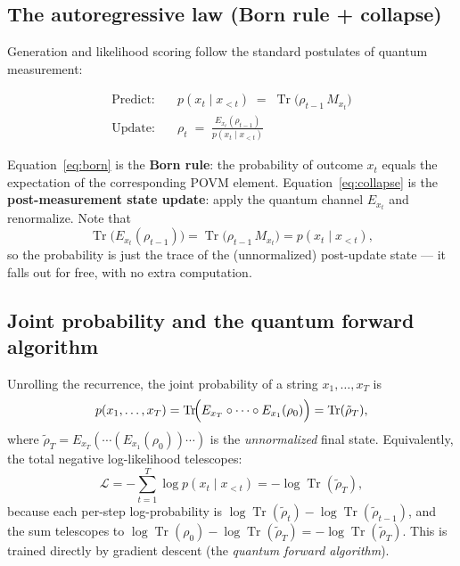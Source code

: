 \documentclass[11pt,a4paper]{article}
\newcommand{\Tr}{\operatorname{Tr}}
\newcommand{\Ex}[1]{E_{#1}}         %
\newcommand{\Mx}[1]{M_{#1}}         %
\newcommand{\NLL}{\mathcal{L}}
\theoremstyle{plain}
\begin{document}
\subsection{The autoregressive law (Born rule + collapse)}

Generation and likelihood scoring follow the standard postulates of
quantum measurement:

\begin{align}
  \text{Predict:} \quad &
    p(x_t \mid x_{<t}) \;=\; \Tr\!\bigl(\rho_{t-1}\,\Mx{x_t}\bigr)
    \label{eq:born}
  \\[6pt]
  \text{Update:} \quad &
    \rho_t \;=\; \frac{\Ex{x_t}(\rho_{t-1})}{p(x_t \mid x_{<t})}
    \label{eq:collapse}
\end{align}

Equation~\eqref{eq:born} is the \textbf{Born rule}: the probability of
outcome $x_t$ equals the expectation of the corresponding POVM element.
Equation~\eqref{eq:collapse} is the \textbf{post-measurement state
update}: apply the quantum channel $\Ex{x_t}$ and renormalize. Note
that
\[
  \Tr\bigl(\Ex{x_t}(\rho_{t-1})\bigr)
  = \Tr\!\bigl(\rho_{t-1}\,\Mx{x_t}\bigr)
  = p(x_t \mid x_{<t}),
\]
so the probability is just the trace of the (unnormalized) post-update
state --- it falls out for free, with no extra computation.

\subsection{Joint probability and the quantum forward algorithm}

Unrolling the recurrence, the joint probability of a string
$x_1,\ldots,x_T$ is
\begin{equation}\label{eq:joint}
  p(x_1,\ldots,x_T)
  = \Tr\!\Bigl(\Ex{x_T} \circ \cdots \circ \Ex{x_1}(\rho_0)\Bigr)
  = \Tr(\tilde\rho_T),
\end{equation}
where $\tilde\rho_T = \Ex{x_T}(\cdots(\Ex{x_1}(\rho_0))\cdots)$ is
the \emph{unnormalized} final state. Equivalently, the total
negative log-likelihood telescopes:
\begin{equation}\label{eq:nll_telescope}
  \NLL
  = -\sum_{t=1}^T \log p(x_t \mid x_{<t})
  = -\log \Tr(\tilde\rho_T),
\end{equation}
because each per-step log-probability is $\log\Tr(\tilde\rho_t) -
\log\Tr(\tilde\rho_{t-1})$, and the sum telescopes to
$\log\Tr(\rho_0) - \log\Tr(\tilde\rho_T) = -\log\Tr(\tilde\rho_T)$.
This is trained directly by gradient descent (the \emph{quantum forward
algorithm}).
\end{document}
